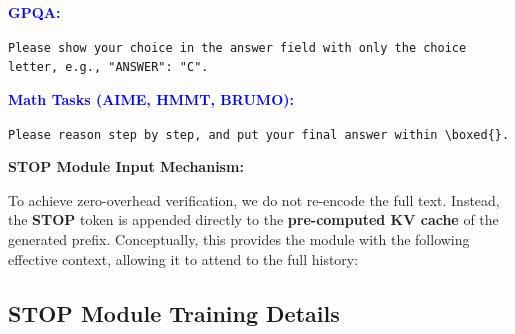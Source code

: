 \documentclass[11pt]{article}
\theoremstyle{plain}
\begin{document}
\begin{tcolorbox}[
    colback=white, 
    colframe=gray!60!black, 
    title=\textbf{Prompt Templates \& Input Format},
    fonttitle=\bfseries\large,
    boxrule=1pt,
    arc=2mm
]
\noindent\textbf{\textcolor{blue}{GPQA:}}

\noindent\texttt{Please show your choice in the answer field with only the choice letter, e.g., "ANSWER": "C".}

\vspace{1em} 

\noindent\textbf{\textcolor{blue}{Math Tasks (AIME, HMMT, BRUMO):}}

\noindent\texttt{Please reason step by step, and put your final answer within \textbackslash boxed\{\}.}

\vspace{1em}
\tcbline 
\vspace{0.5em}



\noindent\textbf{STOP Module Input Mechanism:}

To achieve zero-overhead verification, we do not re-encode the full text. Instead, the \textbf{STOP} token is appended directly to the \textbf{pre-computed KV cache} of the generated prefix.
Conceptually, this provides the module with the following effective context, allowing it to attend to the full history:

\begin{center}
\end{center}

\end{tcolorbox}

\subsection{STOP Module Training Details}
\label{app:training_details}
\end{document}
